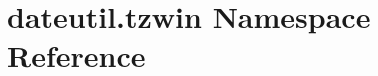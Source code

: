 \hypertarget{namespacedateutil_1_1tzwin}{}\section{dateutil.\+tzwin Namespace Reference}
\label{namespacedateutil_1_1tzwin}
